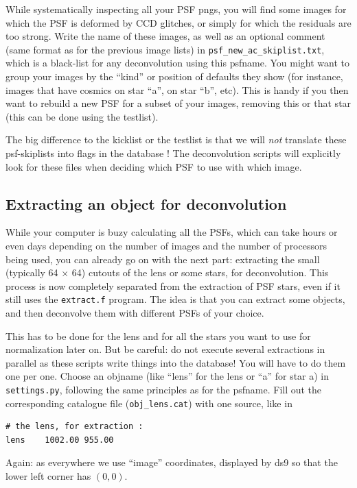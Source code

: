 While systematically inspecting all your PSF pngs, you will find some images for which the PSF is deformed by CCD glitches, or simply for which the residuals are too strong. Write the name of these images, as well as an optional comment (same format as for the previous image lists) in \verb+psf_new_ac_skiplist.txt+, which is a black-list for any deconvolution using this psfname. You might want to group your images by the ``kind'' or position of defaults they show (for instance, images that have cosmics on star ``a'', on star ``b'', etc). This is handy if you then want to rebuild a new PSF for a subset of your images, removing this or that star (this can be done using the testlist).

The big difference to the kicklist or the testlist is that we will \emph{not} translate these psf-skiplists into flags in the database ! The deconvolution scripts will explicitly look for these files when deciding which PSF to use with which image.

\subsection{Extracting an object for deconvolution}

While your computer is buzy calculating all the PSFs, which can take hours or even days depending on the number of images and the number of processors being used, you can already go on with the next part: extracting the small (typically 64 $\times$ 64) cutouts of the lens or some stars, for deconvolution. This process is now completely separated from the extraction of PSF stars, even if it still uses the \verb+extract.f+ program. The idea is that you can extract some objects, and then deconvolve them with different PSFs of your choice.

This has to be done for the lens and for all the stars you want to use for normalization later on. But be careful: do not execute several extractions in parallel as these scripts write things into the database! You will have to do them one per one.
Choose an objname (like ``lens'' for the lens or ``a'' for star a) in \verb+settings.py+, following the same principles as for the psfname. Fill out the corresponding catalogue file (\verb+obj_lens.cat+) with one source, like in

\begin{Verbatim}[fontsize=\relsize{-2}]
# the lens, for extraction :
lens	1002.00	955.00
\end{Verbatim}
Again: as everywhere we use ``image'' coordinates, displayed by ds9 so that the lower left corner has $(0, 0)$.

